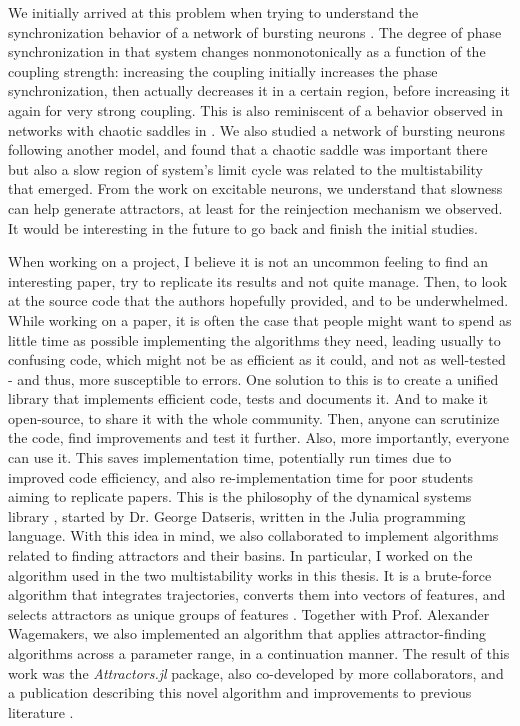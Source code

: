 We initially arrived at this problem when trying to understand the synchronization behavior of a network of bursting neurons \cite{rossi2021phase}. The degree of phase synchronization in that system changes nonmonotonically as a function of the coupling strength: increasing the coupling initially increases the phase synchronization, then actually decreases it in a certain region, before increasing it again for very strong coupling. This is also reminiscent of a behavior observed in networks with chaotic saddles in . We also studied a network of bursting neurons following another model, and found that a chaotic saddle was important there but also a slow region of system's limit cycle was related to the multistability that emerged. From the work on excitable neurons, we understand that slowness can help generate attractors, at least for the reinjection mechanism we observed. It would be interesting in the future to go back and finish the initial studies. 

When working on a project, I believe it is not an uncommon feeling to find an interesting paper, try to replicate its results and not quite manage. Then, to look at the source code that the authors hopefully provided, and to be underwhelmed. While working on a paper, it is often the case that people might want to spend as little time as possible implementing the algorithms they need, leading usually to confusing code, which might not be as efficient as it could, and not as well-tested - and thus, more susceptible to errors. 
One solution to this is to create a unified library that implements efficient code, tests and documents it. And to make it open-source, to share it with the whole community. Then, anyone can scrutinize the code, find improvements and test it further. Also, more importantly, everyone can use it. This saves implementation time, potentially run times due to improved code efficiency, and also re-implementation time for poor students aiming to replicate papers. This is the philosophy of the dynamical systems library \cite{datseris2018dynamical}, started by Dr. George Datseris, written in the Julia programming language. With this idea in mind, we also collaborated to implement algorithms related to finding attractors and their basins. In particular, I worked on the algorithm used in the two multistability works in this thesis. It is a brute-force algorithm that integrates trajectories, converts them into vectors of features, and selects attractors as unique groups of features \cite{gelbrecht2020monte, stender2021bstab, datseris2023framework}. Together with Prof. Alexander Wagemakers, we also implemented an algorithm that applies attractor-finding algorithms across a parameter range, in a continuation manner. The result of this work was the \textit{Attractors.jl} package, also co-developed by more collaborators, and a publication describing this novel algorithm and improvements to previous literature \cite{datseris2023framework}.


